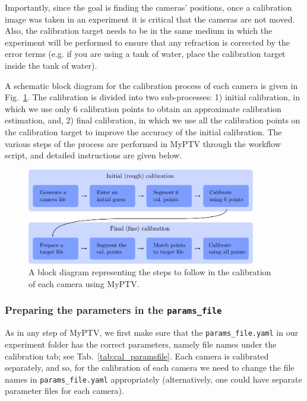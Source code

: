 \documentclass[10pt,a4paper]{article}
\begin{document}
Importantly, since the goal is finding the cameras' positions, once a calibration image was taken in an experiment it is critical that the cameras are not moved. Also, the calibration target needs to be in the same medium in which the experiment will be performed to ensure that any refraction is corrected by the error terms (e.g. if you are using a tank of water, place the calibration target inside the tank of water). 


A schematic block diagram for the calibration process of each camera is given in Fig.~\ref{fig:calibsteps}. The calibration is divided into two sub-processes: 1) initial calibration, in which we use only 6 calibration points to obtain an approximate calibration estimation, and, 2) final calibration, in which we use all the calibration points on the calibration target to improve the accuracy of the initial calibration. The various steps of the process are performed in MyPTV through the workflow script, and detailed instructions are given below. 


\begin{figure}
	\centering
	\includegraphics[width=10cm]{Calibration_steps.pdf}
	\caption{A block diagram representing the steps to follow in the calibration of each camera using MyPTV. \label{fig:calibsteps}}
\end{figure}





\subsubsection{Preparing the parameters in the \texttt{params\_file}}

As in any step of MyPTV, we first make sure that the \texttt{params\_file.yaml} in our experiment folder has the correct parameters, namely file names under the calibration tab; see Tab.~\ref{tab:cal_paramsfile}. Each camera is calibrated separately, and so, for the calibration of each camera we need to change the file names in \texttt{params\_file.yaml} appropriately (alternatively, one could have separate parameter files for each camera).  
\end{document}
